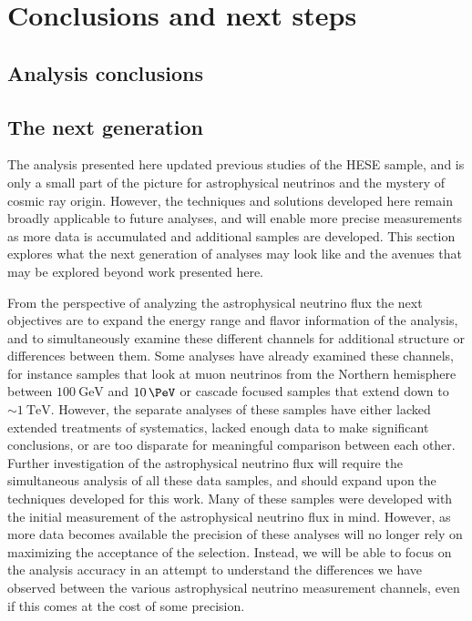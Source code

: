 \chapter{Conclusions and next steps\label{chapter:conclusions}}
\section{Analysis conclusions\label{sec:analysis_conclusions}}
\begingroup
\graphicspath{{results/HESE_Final_Paper/}}

\endgroup
\FloatBarrier

\section{The next generation}
The analysis presented here updated previous studies of the HESE sample, and is only a small part of the picture for astrophysical neutrinos and the mystery of cosmic ray origin.
However, the techniques and solutions developed here remain broadly applicable to future analyses, and will enable more precise measurements as more data is accumulated and additional samples are developed.
This section explores what the next generation of analyses may look like and the avenues that may be explored beyond work presented here.

From the perspective of analyzing the astrophysical neutrino flux the next objectives are to expand the energy range and flavor information of the analysis, and to simultaneously examine these different channels for additional structure or differences between them.
Some analyses have already examined these channels, for instance samples that look at muon neutrinos from the Northern hemisphere between $\SI{100}\GeV$ and $\SI{10}\PeV$ or cascade focused samples that extend down to $\sim\SI{1}\TeV$.
However, the separate analyses of these samples have either lacked extended treatments of systematics, lacked enough data to make significant conclusions, or are too disparate for meaningful comparison between each other.
Further investigation of the astrophysical neutrino flux will require the simultaneous analysis of all these data samples, and should expand upon the techniques developed for this work.
Many of these samples were developed with the initial measurement of the astrophysical neutrino flux in mind.
However, as more data becomes available the precision of these analyses will no longer rely on maximizing the acceptance of the selection.
Instead, we will be able to focus on the analysis accuracy in an attempt to understand the differences we have observed between the various astrophysical neutrino measurement channels, even if this comes at the cost of some precision.

